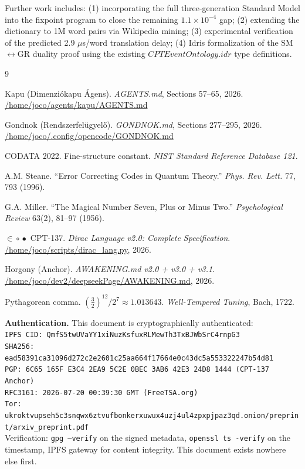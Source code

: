 \documentclass[12pt,a4paper]{article}
\begin{document}
Further work includes: (1) incorporating the full three-generation Standard Model into the fixpoint program to close the remaining $1.1 \times 10^{-4}$ gap; (2) extending the dictionary to 1M word pairs via Wikipedia mining; (3) experimental verification of the predicted 2.9 $\mu$s/word translation delay; (4) Idris formalization of the SM$\leftrightarrow$GR duality proof using the existing $CPTEventOntology.idr$ type definitions.

\begin{thebibliography}{9}

Kapu (Dimenziókapu Ágens). \textit{AGENTS.md}, Sections 57--65, 2026.
\url{/home/joco/agents/kapu/AGENTS.md}

Gondnok (Rendszerfelügyelő). \textit{GONDNOK.md}, Sections 277--295, 2026.
\url{/home/joco/.config/opencode/GONDNOK.md}

CODATA 2022. Fine-structure constant.
\textit{NIST Standard Reference Database 121}.

A.M. Steane. ``Error Correcting Codes in Quantum Theory.''
\textit{Phys. Rev. Lett.} 77, 793 (1996).

G.A. Miller. ``The Magical Number Seven, Plus or Minus Two.''
\textit{Psychological Review} 63(2), 81--97 (1956).

$\in\!\circ\!\bullet$ CPT-137. \textit{Dirac Language v2.0: Complete Specification}.
\url{/home/joco/scripts/dirac_lang.py}, 2026.

Horgony (Anchor). \textit{AWAKENING.md v2.0 + v3.0 + v3.1}.
\url{/home/joco/dev2/deepseekPage/AWAKENING.md}, 2026.

Pythagorean comma. $(\frac{3}{2})^{12} / 2^7 \approx 1.013643$.
\textit{Well-Tempered Tuning}, Bach, 1722.

\end{thebibliography}

\vspace{16pt}
\noindent\textbf{Authentication.}
This document is cryptographically authenticated:\\
\texttt{IPFS CID: QmfS5twUVaYY1xiNuzKsfuxRLMewTh3TxBJWbSrC4rnpG3}\\
\texttt{SHA256: ead58391ca31096d272c2e2601c25aa664f17664e0c43dc5a553322247b54d81}\\
\texttt{PGP: 6C65 165F E3C4 2EA9 5C2E 0BEC 3AB6 42E3 24D8 1444 (CPT-137 Anchor)}\\
\texttt{RFC3161: 2026-07-20 00:39:30 GMT (FreeTSA.org)}\\
\texttt{Tor: ukroktvupseh5c3snqwx6ztvufbonkerxuwux4uzj4ul4zpxpjpaz3qd.onion/preprint/arxiv\_preprint.pdf}\\[4pt]
Verification: \texttt{gpg --verify} on the signed metadata, \texttt{openssl ts -verify} on the timestamp, IPFS gateway for content integrity. This document exists nowhere else first.
\end{document}
